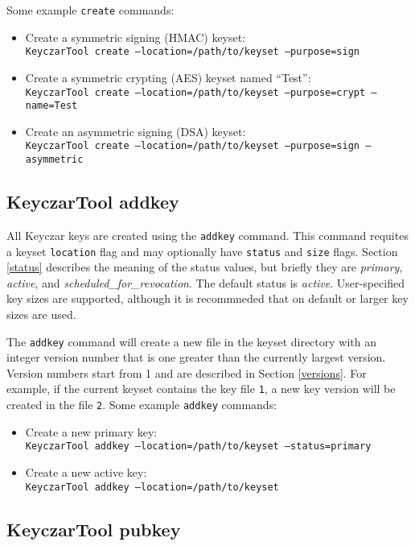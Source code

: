 \documentclass{llncs}
\begin{document}
Some example {\tt create} commands:
\begin{itemize}
\item Create a symmetric signing (HMAC) keyset: \\
{\tt KeyczarTool create --location=/path/to/keyset --purpose=sign}
\item Create a symmetric crypting (AES) keyset named ``Test'': \\
{\tt KeyczarTool create --location=/path/to/keyset --purpose=crypt --name=Test}
\item Create an asymmetric signing (DSA) keyset: \\
{\tt KeyczarTool create --location=/path/to/keyset --purpose=sign --asymmetric} 
\end{itemize}

\subsection{KeyczarTool addkey}

All Keyczar keys are created using the {\tt addkey} command. This command
requites a keyset {\tt location} flag and may optionally have {\tt status} and
{\tt size} flags. Section \ref{status} describes the meaning of the status
values, but briefly they are {\it primary}, {\it active}, and {\it
scheduled\_for\_revocation}. The default status is {\it active}. User-specified
key sizes are supported, although it is recommneded that on default or larger
key  sizes are used.

The {\tt addkey} command will create a new file in the keyset directory with an
integer version number that is one greater than the currently largest version.
Version numbers start from 1 and are described in Section \ref{versions}. For
example, if the current keyset contains the key file {\tt 1}, a new key version
will be created in the file {\tt 2}. Some example {\tt addkey} commands:
\begin{itemize}
\item Create a new primary key: \\
{\tt KeyczarTool addkey --location=/path/to/keyset --status=primary}
\item Create a new active key: \\
{\tt KeyczarTool addkey --location=/path/to/keyset} 
\end{itemize}

\subsection{KeyczarTool pubkey}
\end{document}
